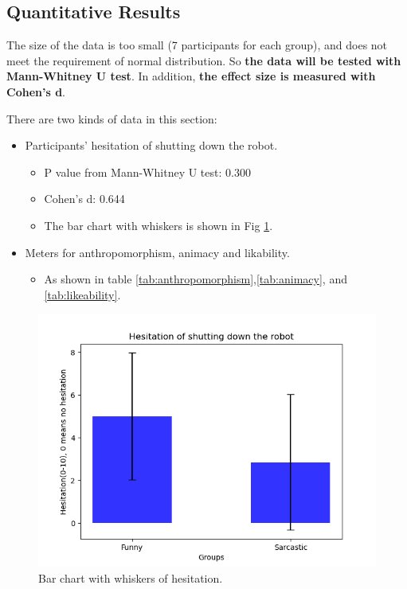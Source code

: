 \documentclass[conference]{IEEEtran}
\begin{document}
\subsection{Quantitative Results}


The size of the data is too small (7 participants for each group), and does not meet the requirement of normal distribution. So \textbf{the data will be tested with Mann-Whitney U test}. In addition, \textbf{the effect size is measured with Cohen's d}.

There are two kinds of data in this section: 
\begin{itemize}
    \item Participants' hesitation of shutting down the robot.
    \begin{itemize}
        \item P value from Mann-Whitney U test: 0.300
        \item Cohen's d: 0.644
        \item The bar chart with whiskers is shown in Fig \ref{fig:HesitationBar}.
    \end{itemize}
    \item Meters for anthropomorphism, animacy and likability.
    \begin{itemize}
        \item As shown in table \ref{tab:anthropomorphism},\ref{tab:animacy}, and \ref{tab:likeability}.
    \end{itemize} 
\end{itemize}

    \begin{figure}[htbp]
        \centering
        \includegraphics[width = \linewidth]{Pics/HesitationBar.png}
        \caption{Bar chart with whiskers of hesitation.}
        \label{fig:HesitationBar}
    \end{figure}
    
\end{document}
